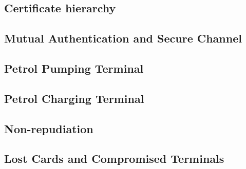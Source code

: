 \documentclass[a4paper,10pt]{llncs}
\begin{document}
\subsection{Certificate hierarchy}


\subsection{Mutual Authentication and Secure Channel}
\label{section:mutualauth}


\subsection{Petrol Pumping Terminal}


\subsection{Petrol Charging Terminal}


\subsection{Non-repudiation}


\subsection{Lost Cards and Compromised Terminals}
\label{section:lost}

\end{document}
